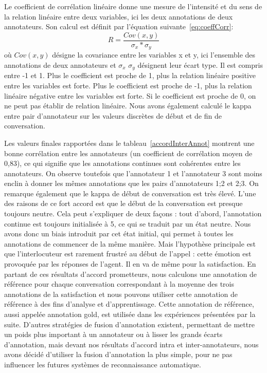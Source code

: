 Le coefficient de corrélation linéaire donne une mesure de l'intensité et du sens de la relation linéaire entre deux variables, ici les deux annotations de deux annotateurs. Son calcul est définit par l'équation suivante~\ref{eq:coeffCorr}:
\begin{equation}
  R = \dfrac{Cov(x,y)}{\sigma_x*\sigma_y}
  \label{eq:coeffCorr}
\end{equation}
où $Cov(x,y)$ désigne la covariance entre les variables x et y, ici l'ensemble des annotations de deux annotateurs et $\sigma_x$ $\sigma_y$ désignent leur écart type.
Il est compris entre -1 et 1. Plus le coefficient est proche de 1, plus la relation linéaire positive entre les variables est forte. Plus le coefficient est proche de -1, plus la relation linéaire négative entre les variables est forte. Si le coefficient est proche de 0, on ne peut pas établir de relation linéaire.
Nous avons également calculé le kappa entre pair d'annotateur sur les valeurs discrètes de début et de fin de conversation.


Les valeurs finales rapportées dans le tableau~\ref{accordInterAnnot} montrent une bonne corrélation entre les annotateurs (un coefficient de corrélation moyen de 0,83), ce qui signifie que les annotations continues sont cohérentes entre les annotateurs.
On observe toutefois que l'annotateur 1 et l'annotateur 3 sont moins enclin à donner les mêmes annotations que les pairs d'annotateurs 1;2 et 2;3. On remarque également que le kappa de début de conversation est très élevé. L’une des raisons de ce fort accord est que le début de la conversation est presque toujours neutre. Cela peut s’expliquer de deux façons : tout d’abord, l’annotation continue est toujours initialisée à 5, ce qui se traduit par un état neutre. Nous avons donc un biais introduit par cet état initial, qui permet à toutes les annotations de commencer de la même manière.
Mais l’hypothèse principale est que l’interlocuteur est rarement frustré au début de l’appel : cette émotion est provoquée par les réponses de l’agent. Il en va de même pour la satisfaction. En partant de ces résultats d’accord prometteurs, nous calculons une annotation de référence pour chaque conversation correspondant à la moyenne des trois annotations de la satisfaction et nous pouvons utiliser cette annotation de référence à des fins d’analyse et d’apprentissage. Cette annotation de référence, aussi appelée annotation gold, est utilisée dans les expériences présentées par la suite.
D'autres stratégies de fusion d'annotation existent, permettant de mettre un poids plus important à un annotateur ou à lisser les grands écarts d'annotation, mais devant nos résultats d'accord intra et inter-annotateurs, nous avons décidé d'utiliser la fusion d'annotation la plus simple, pour ne pas influencer les futures systèmes de reconnaissance automatique.

